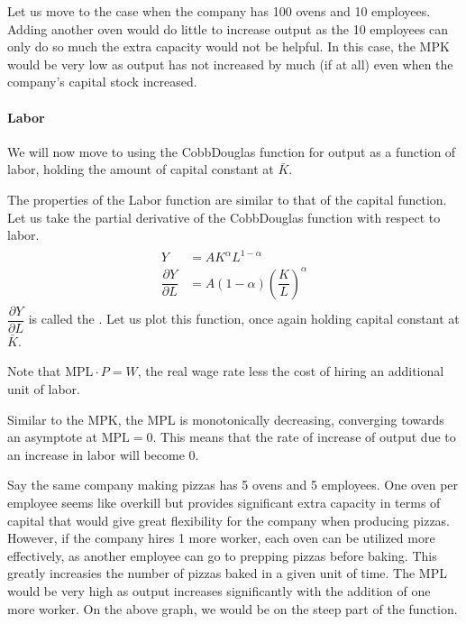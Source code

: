 \documentclass[letterpaper,10pt,english]{jupyterBook}
\begin{document}
\sphinxAtStartPar
Let us move to the case when the company has 100 ovens and 10 employees. Adding another oven would do little to increase output as the 10 employees can only do so much \sphinxhyphen{} the extra capacity would not be helpful. In this case, the MPK would be very low as output has not increased by much (if at all) even when the company’s capital stock increased.


\paragraph{Labor}
\label{\detokenize{content/04-production/production:labor}}
\sphinxAtStartPar
We will now move to using the Cobb\sphinxhyphen{}Douglas function for output as a function of labor, holding the amount of capital constant at \(\bar K\).

\noindent{}

\sphinxAtStartPar
The properties of the Labor function are similar to that of the capital function. Let us take the partial derivative of the Cobb\sphinxhyphen{}Douglas function with respect to labor.
\begin{equation*}
\begin{split}\begin{aligned}
Y &= A K^\alpha L^{1 - \alpha} \\
\dfrac{\partial Y}{\partial L} &= A (1 - \alpha) \left ( \dfrac{K}{L} \right )^{\alpha}
\end{aligned}\end{split}
\end{equation*}
\sphinxAtStartPar
\(\dfrac{\partial Y}{\partial L}\) is called the . Let us plot this function, once again holding capital constant at \(\bar K\).

\noindent{}

\sphinxAtStartPar
Note that \(\text{MPL} \cdot P = W\), the real wage rate less the cost of hiring an additional unit of labor.

\sphinxAtStartPar
Similar to the MPK, the MPL is monotonically decreasing, converging towards an asymptote at \(\text{MPL} = 0\). This means that the rate of increase of output due to an increase in labor will become 0.

\sphinxAtStartPar
Say the same company making pizzas has 5 ovens and 5 employees. One oven per employee seems like overkill but provides significant extra capacity in terms of capital that would give great flexibility for the company when producing pizzas. However, if the company hires 1 more worker, each oven can be utilized more effectively, as another employee can go to prepping pizzas before baking. This greatly increasies the number of pizzas baked in a given unit of time. The MPL would be very high as output increases significantly with the addition of one more worker. On the above graph, we would be on the steep part of the function.
\end{document}
